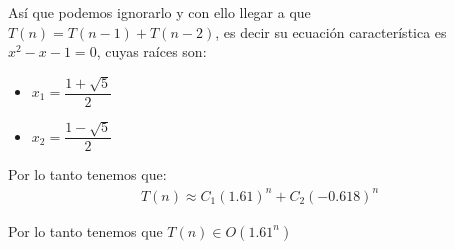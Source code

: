 \documentclass[12pt, fleqn]{article}                            %
\theoremstyle{break}                                            %
\begin{document}
        Así que podemos ignorarlo y con ello llegar a que $T(n) = T(n -1) + T(n -2)$,
        es decir su ecuación característica es $x^2 - x- 1= 0$, cuyas raíces son:
        \begin{itemize}
            \item $x_1 = \dfrac{1+\sqrt{5}}{2}$
            \item $x_2 = \dfrac{1-\sqrt{5}}{2}$
        \end{itemize}

        Por lo tanto tenemos que:
        \begin{align*}
            T(n) \approx C_1 (1.61)^n + C_2(-0.618)^n
        \end{align*}

        Por lo tanto tenemos que $T(n) \in O(1.61^n)$
\end{document}
